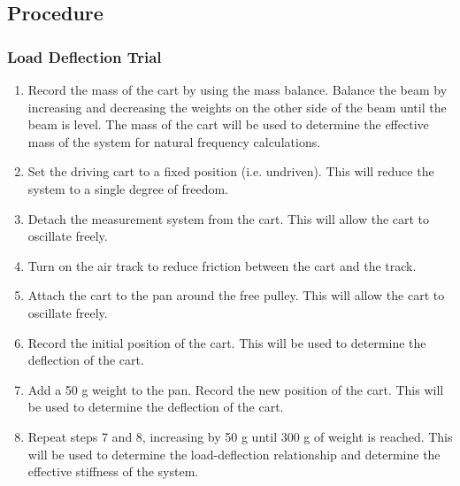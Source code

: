 
\subsection{Procedure}
\subsubsection{Load Deflection Trial}

\begin{enumerate}
    \item Record the mass of the cart by using the mass balance. Balance the beam by increasing and decreasing the weights on the other side of the beam until the beam is level. The mass of the cart will be used to determine the effective mass of the system for natural frequency calculations.
    \item Set the driving cart to a fixed position (i.e. undriven). This will reduce the system to a single degree of freedom.
    \item Detach the measurement system from the cart. This will allow the cart to oscillate freely.
    \item Turn on the air track to reduce friction between the cart and the track.
    \item Attach the cart to the pan around the free pulley. This will allow the cart to oscillate freely.
    \item Record the initial position of the cart. This will be used to determine the deflection of the cart.
    \item Add a 50 g weight to the pan. Record the new position of the cart. This will be used to determine the deflection of the cart.
    \item Repeat steps 7 and 8, increasing by 50 g until 300 g of weight is reached. This will be used to determine the load-deflection relationship and determine the effective stiffness of the system.
\end{enumerate}

